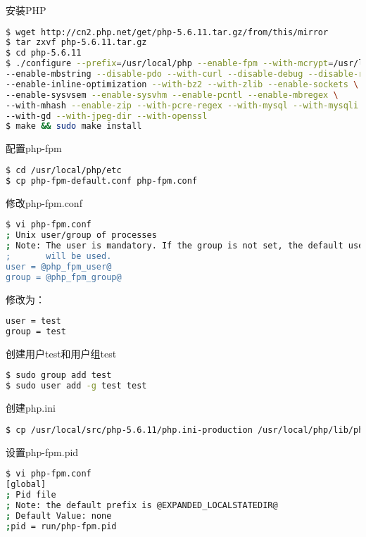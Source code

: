 安装PHP


\begin{lstlisting}[language=bash]
$ wget http://cn2.php.net/get/php-5.6.11.tar.gz/from/this/mirror
$ tar zxvf php-5.6.11.tar.gz
$ cd php-5.6.11
$ ./configure --prefix=/usr/local/php --enable-fpm --with-mcrypt=/usr/local/libmcrypt \
--enable-mbstring --disable-pdo --with-curl --disable-debug --disable-rpath \
--enable-inline-optimization --with-bz2 --with-zlib --enable-sockets \
--enable-sysvsem --enable-sysvhm --enable-pcntl --enable-mbregex \
--with-mhash --enable-zip --with-pcre-regex --with-mysql --with-mysqli \
--with-gd --with-jpeg-dir --with-openssl
$ make && sudo make install
\end{lstlisting}

配置php-fpm


\begin{lstlisting}[language=bash]
$ cd /usr/local/php/etc
$ cp php-fpm-default.conf php-fpm.conf
\end{lstlisting}

修改php-fpm.conf


\begin{lstlisting}[language=bash]
$ vi php-fpm.conf
; Unix user/group of processes
; Note: The user is mandatory. If the group is not set, the default user's group
;       will be used.
user = @php_fpm_user@
group = @php_fpm_group@
\end{lstlisting}

修改为：


\begin{lstlisting}[language=bash]
user = test
group = test
\end{lstlisting}

创建用户test和用户组test


\begin{lstlisting}[language=bash]
$ sudo group add test
$ sudo user add -g test test
\end{lstlisting}

创建php.ini

\begin{lstlisting}[language=bash]
$ cp /usr/local/src/php-5.6.11/php.ini-production /usr/local/php/lib/php.ini
\end{lstlisting}

设置php-fpm.pid

\begin{lstlisting}[language=bash]
$ vi php-fpm.conf
[global]
; Pid file
; Note: the default prefix is @EXPANDED_LOCALSTATEDIR@
; Default Value: none
;pid = run/php-fpm.pid
\end{lstlisting}

